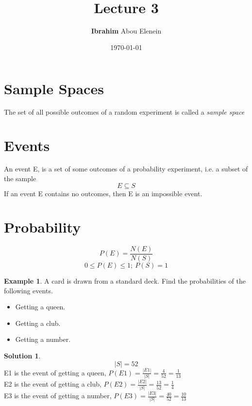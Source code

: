 \documentclass[12pt]{article}
\title{\textbf{Lecture 3}} %
\author{\textbf{Ibrahim} Abou Elenein}
\date{\today} %
\theoremstyle{definition}
\newtheorem{exmp}{Example}[section]
\newtheorem{slo}{Solution}[section]
\begin{document}
\setlength{\droptitle}{-5em}    
\maketitle
\tableofcontents
\pagebreak

\section{Sample Spaces}
The set of all possible outcomes of a random
experiment is called a \textit{sample space}
\section{Events}
An event E, is a set of some outcomes of a
probability experiment, i.e. a subset of the sample
\[
    E \subseteq S
\]
If an event E contains no outcomes, then E is an impossible event.

\section{Probability}
\[
    P(E) = \frac{N(E)}{N(S)}
\]
\[
    0 \leq P (E) \leq 1  ;  \ P(S) = 1 
\]
\begin{exmp}
    A card is drawn from a standard deck.
    Find the probabilities of the following events.
    \begin{itemize}
        \item Getting a queen.
        \item Getting a club.
        \item Getting a number.
    \end{itemize}       

\end{exmp}    
\begin{slo}
    \[
        |S| = 52
    \]
    E1 is the event of getting a queen,
    $\displaystyle P(E1) = \frac{|E1|}{|S|} = \frac{4}{52}=  \frac{1}{13}$
    \\ 
    E2 is the event of getting a club,
    $\displaystyle P(E2) = \frac{|E2|}{|S|} = \frac{13}{52}=  \frac{1}{4}$ \\
    E3 is the event of getting a number,
    $ \displaystyle P(E3) = \frac{|E3|}{|S|} = \frac{40}{52}=  \frac{10}{13}$ \\


\end{slo}
\end{document}
